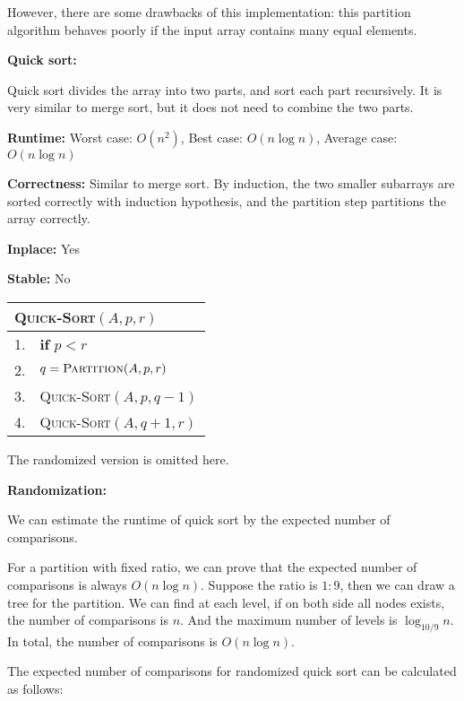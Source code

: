 \documentclass[a4paper,12pt]{article}
\begin{document}
However, there are some drawbacks of this implementation:
this partition algorithm behaves poorly if the input array contains many equal elements.

\vspace{1cm}
\textbf{Quick sort:}

Quick sort divides the array into two parts, and sort each part recursively.
It is very similar to merge sort, but it does not need to combine the two parts.

\textbf{Runtime:}
Worst case: $O(n^2)$, Best case: $O(n \log n)$, Average case: $O(n \log n)$

\textbf{Correctness:}
Similar to merge sort.
By induction, the two smaller subarrays are sorted correctly with induction hypothesis, and the partition step partitions the array correctly.

\textbf{Inplace:}
Yes

\textbf{Stable:}
No

\begin{center}
	\begin{tabular}{rl}
		\toprule
		\multicolumn{2}{l}{\textsc{Quick-Sort}$(A, p, r)$} \\
		\midrule
		1. & \textbf{if} $p < r$ \\
		2. & \quad $q = \textsc{Partition}(A, p, r)$ \\
		3. & \quad \textsc{Quick-Sort}$(A, p, q - 1)$ \\
		4. & \quad \textsc{Quick-Sort}$(A, q + 1, r)$ \\
		\bottomrule
	\end{tabular}
\end{center}

The randomized version is omitted here.

\vspace{1cm}
\textbf{Randomization:}

We can estimate the runtime of quick sort by the expected number of comparisons.

For a partition with fixed ratio, we can prove that the expected number of comparisons is always $O(n \log n)$.
Suppose the ratio is $1 : 9$, then we can draw a tree for the partition.
We can find at each level, if on both side all nodes exists, the number of comparisons is $n$.
And the maximum number of levels is $\log_{10/9} n$.
In total, the number of comparisons is $O(n \log n)$.

\vspace{1cm}
The expected number of comparisons for randomized quick sort can be calculated as follows:
\end{document}
